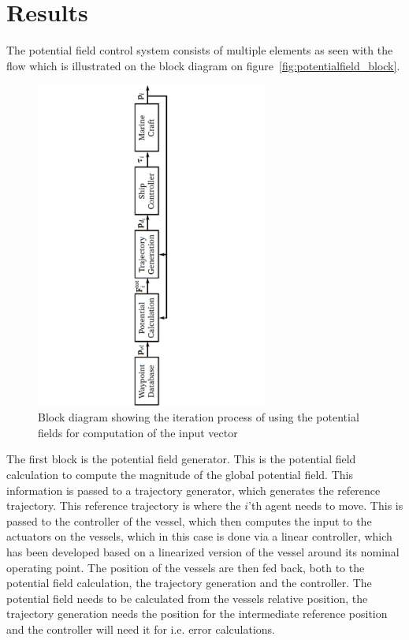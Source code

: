 \documentclass[conference]{IEEEtran}
\newcommand{\colwidth}{3in}
\begin{document}
\section{Results}
The potential field control system consists of multiple elements
as seen with the flow which is illustrated on the block diagram on
figure~\vref{fig:potentialfield_block}.
\begin{figure}[htbp]
\centering
\includegraphics[width=\colwidth]{fig/potentialfield_block}
\caption{Block diagram showing the iteration process of using the
potential fields for computation of the input vector}
\label{fig:potentialfield_block}
\end{figure}
The first block is the potential field generator. This is the
potential field calculation to compute the magnitude of the global
potential field. This information is passed to a trajectory generator,
which generates the reference trajectory. This reference trajectory is
where the $i$'th agent needs to move. This is passed to the controller
of the vessel, which then computes the input to the actuators on the
vessels, which in this case is done via a linear controller, which has been developed based on a linearized version of the vessel around its nominal operating point. The position of the vessels are then fed back, both to the
potential field calculation, the trajectory generation and the
controller. The potential field needs to be calculated from the
vessels relative position, the trajectory generation needs the
position for the intermediate reference position and the controller
will need it for i.e. error calculations.
\end{document}
